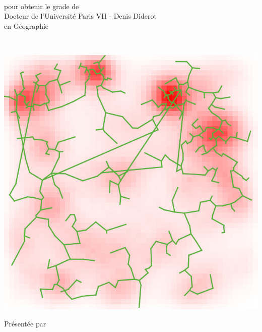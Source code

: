 
\begin{titlepage}

\begin{addmargin}[-1cm]{-3cm}
\begin{center}
\large

\hfill
\vfill

\begingroup
{}\\
pour obtenir le grade de\\
Docteur de l'Université Paris VII - Denis Diderot\\
en Géographie\\\vspace{1cm}
\endgroup

\vfill

\begingroup
\color{Maroon}\spacedallcaps{\myTitle} \\ \bigskip %
\endgroup

\vfill

\includegraphics[width=\textwidth]{Figures/Cover/cover} \\ \vspace{0.5cm} %

Présentée par\\
\spacedlowsmallcaps{\myName}\\ %
\bigskip



\end{center}
\end{addmargin}
\end{titlepage}
